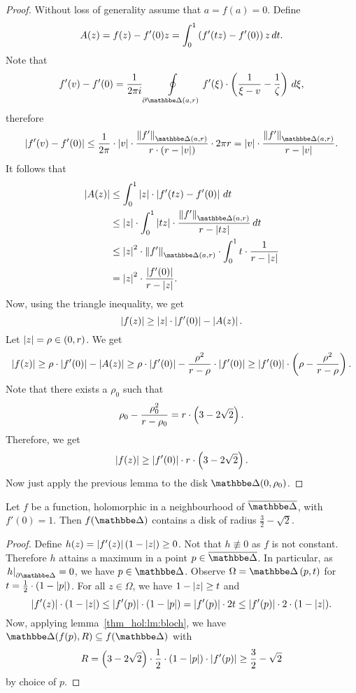 \begin{proof}
Without loss of generality assume that $a = f(a) = 0$. Define
\[
A(z) = f(z) - f'(0) z = \int_0^1 \left(f'(tz) - f'(0)\right) z \,dt.
\]
Note that
\[
f'(v) - f'(0) =
\frac{1}{2 \pi i} \olint_{\partial \dsk(a, r)}
f'(\xi) \cdot \br{\frac{1}{\xi-v} - \frac{1}{\zeta}}\,d\xi,
\]
therefore
\[
\abs{f'(v) - f'(0)} \leq
\frac{1}{2 \pi} \cdot \abs{v} \cdot
\frac{\norm{f'}_{\dsk(a,r)}}{r \cdot (r - \abs{v})} \cdot 2 \pi r =
\abs{v} \cdot \frac{\norm{f'}_{\dsk(a,r)}}{r - \abs{v}}.
\]
It follows that
\begin{align*}
\abs{A(z)} &\leq
\int_0^1 \abs{z} \cdot \abs{f'(tz) - f'(0)}\,dt
\\
&\leq
\abs{z} \cdot \int_0^1
\abs{tz} \cdot \frac{\norm{f'}_{\dsk(a,r)}}{r - \abs{tz}}\,dt
\\
&\leq
\abs{z}^2 \cdot \norm{f'}_{\dsk(a,r)} \cdot \int_0^1
t \cdot \frac{1}{r - \abs{z}}
\\
&=
\abs{z}^2 \cdot
\frac{\abs{f'(0)}}{r - \abs{z}}.
\end{align*}
Now, using the triangle inequality, we get
\[
\left\lvert f(z)\right\rvert \geq \left\lvert z\right\rvert \cdot \left\lvert f'(0)\right\rvert - \left\lvert A(z)\right\rvert.
\]
Let $\left\lvert z\right\rvert = \rho \in (0, r)$. We get
\[
\left\lvert f(z)\right\rvert \geq
\rho \cdot \left\lvert f'(0)\right\rvert - \left\lvert A(z)\right\rvert \geq
\rho \cdot \left\lvert f'(0)\right\rvert -
\frac{\rho^2}{r - \rho} \cdot \left\lvert f'(0)\right\rvert \geq
\left\lvert f'(0)\right\rvert \cdot \left(\rho - \frac{\rho^2}{r - \rho}\right).
\]
Note that there exists a $\rho_0$ such that
\[
\rho_0 - \frac{\rho_0^2}{r - \rho_0} =
r \cdot \left(3 - 2 \sqrt{2}\right).
\]
Therefore, we get
\[
\left\lvert f(z)\right\rvert \geq \left\lvert f'(0)\right\rvert \cdot r \cdot \left(3 - 2 \sqrt{2}\right).
\]
Now just apply the previous lemma to the disk $\dsk(0, \rho_0)$.
\end{proof}

\begin{izrek}[Bloch]
Let $f$ be a function, holomorphic in a neighbourhood of
$\oline{\dsk}$, with $f'(0) = 1$. Then $f(\dsk)$ contains a disk of
radius $\frac{3}{2} - \sqrt{2}$.
\end{izrek}


\begin{proof}
Define $h(z) = \left\lvert f'(z)\right\rvert (1-\left\lvert z\right\rvert) \geq 0$. Not that
$h \not \equiv 0$ as $f$ is not constant. Therefore $h$ attains a
maximum in a point $p \in \oline{\dsk}$. In particular, as
$\eval{h}{\partial \dsk}{} = 0$, we have $p \in \dsk$. Observe
$\Omega = \dsk \br{p, t}$ for
$t = \frac{1}{2} \cdot (1 - \left\lvert p\right\rvert)$.
For all $z \in \Omega$, we have $1 - \left\lvert z\right\rvert \geq t$ and
\[
\left\lvert f'(z)\right\rvert \cdot (1 - \left\lvert z\right\rvert) \leq
\left\lvert f'(p)\right\rvert \cdot (1 - \left\lvert p\right\rvert) =
\left\lvert f'(p)\right\rvert \cdot 2t \leq
\left\lvert f'(p)\right\rvert \cdot 2 \cdot (1 - \left\lvert z\right\rvert).
\]
Now, applying lemma~\ref{thm_hol:lm:bloch}, we have
$\dsk(f(p), R) \subseteq f(\dsk)$ with
\[
R =
\left(3 - 2 \sqrt{2}\right) \cdot \frac{1}{2}
\cdot (1 - \left\lvert p\right\rvert) \cdot \left\lvert f'(p)\right\rvert \geq
\frac{3}{2} - \sqrt{2}
\]
by choice of $p$.
\end{proof}

